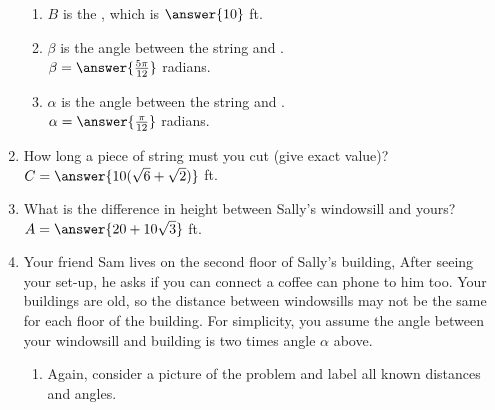 \documentclass{ximera}
\begin{document}
\begin{exercise}
\begin{enumerate}
\begin{enumerate}
\item $B$ is the , which is $\answer{10}$ ft.

\item $\beta$ is the angle between the string and . \smallskip\\
$\beta = \answer{\frac{5\pi}{12}}$ radians.

\item $\alpha$ is the angle between the string and . \smallskip\\
$\alpha = \answer{\frac{\pi}{12}}$ radians.
\end{enumerate}

\item How long a piece of string must you cut (give exact value)? $C = \answer{10(\sqrt{6}+\sqrt{2})}$ ft.

\item What is the difference in height between Sally's windowsill and yours? $A = \answer{20+10\sqrt{3}}$ ft.

\item \begin{exercise}
Your friend Sam lives on the second floor of Sally's building, After seeing your set-up, he asks if you can connect a coffee can phone to him too. 
Your buildings are old, so the distance between windowsills may not be the same for each floor of the building. For simplicity, you assume the angle between your windowsill and building is two times angle $\alpha$ above.
%
\begin{enumerate}
\item Again, consider a picture of the problem and label all known distances and angles.
\begin{image}[2in]
		\end{image}


\end{enumerate}
\end{exercise}
\end{enumerate}
\end{exercise}
\end{document}
